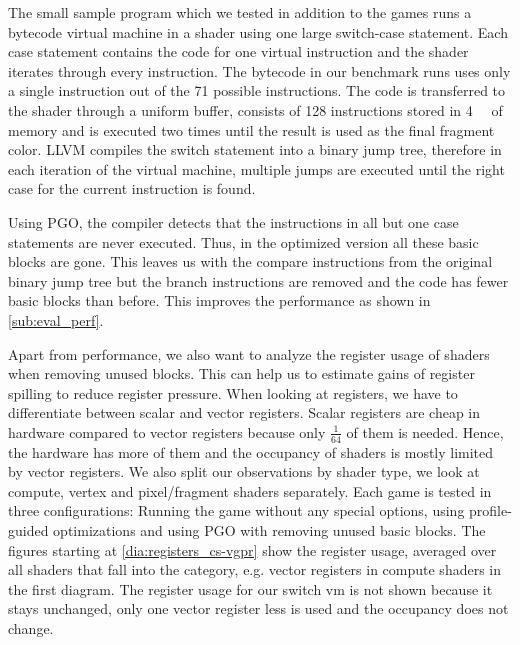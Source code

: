 The small sample program which we tested in addition to the games runs a bytecode virtual machine in a shader using one large switch-case statement.
Each case statement contains the code for one virtual instruction and the shader iterates through every instruction.
The bytecode in our benchmark runs uses only a single instruction out of the 71 possible instructions.
The code is transferred to the shader through a uniform buffer, consists of 128 instructions stored in \SI{4}{\kibi\byte} of memory and is executed two times until the result is used as the final fragment color.
LLVM compiles the switch statement into a binary jump tree, therefore in each iteration of the virtual machine, multiple jumps are executed until the right case for the current instruction is found.

Using PGO, the compiler detects that the instructions in all but one case statements are never executed.
Thus, in the optimized version all these basic blocks are gone.
This leaves us with the compare instructions from the original binary jump tree but the branch instructions are removed and the code has fewer basic blocks than before.
This improves the performance as shown in \cref{sub:eval_perf}.

Apart from performance, we also want to analyze the register usage of shaders when removing unused blocks.
This can help us to estimate gains of register spilling to reduce register pressure.
When looking at registers, we have to differentiate between scalar and vector registers.
Scalar registers are cheap in hardware compared to vector registers because only $\frac{1}{64}$ of them is needed.
Hence, the hardware has more of them and the occupancy of shaders is mostly limited by vector registers.
We also split our observations by shader type, we look at compute, vertex and pixel/fragment shaders separately.
Each game is tested in three configurations: Running the game without any special options, using profile-guided optimizations and using PGO with removing unused basic blocks.
The figures starting at \cref{dia:registers_cs-vgpr} show the register usage, averaged over all shaders that fall into the category, e.g. vector registers in compute shaders in the first diagram.
The register usage for our switch vm is not shown because it stays unchanged, only one vector register less is used and the occupancy does not change.


